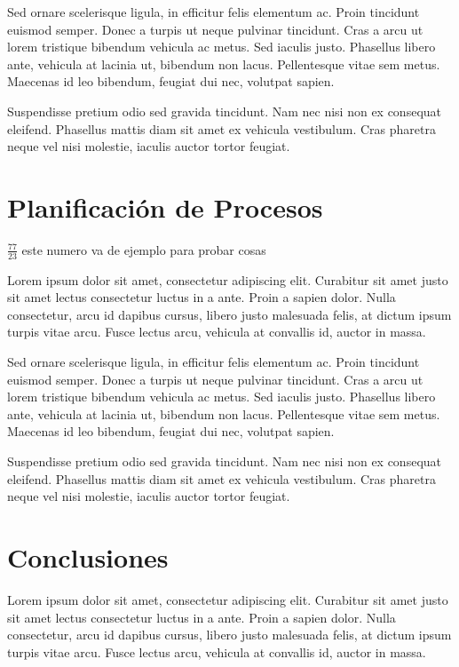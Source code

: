 \documentclass[conference]{IEEEtran}
\begin{document}
Sed ornare scelerisque ligula, in efficitur felis elementum ac. Proin tincidunt euismod semper. Donec a turpis ut neque pulvinar tincidunt. Cras a arcu ut lorem tristique bibendum vehicula ac metus. Sed iaculis justo. Phasellus libero ante, vehicula at lacinia ut, bibendum non lacus. Pellentesque vitae sem metus. Maecenas id leo bibendum, feugiat dui nec, volutpat sapien.
 
Suspendisse pretium odio sed gravida tincidunt. Nam nec nisi non ex consequat eleifend. Phasellus mattis diam sit amet ex vehicula vestibulum. Cras pharetra neque vel nisi molestie, iaculis auctor tortor feugiat.


\section{Planificación de Procesos}
\label{sec:planificacion}
$\frac{77}{23}$ este numero va de ejemplo para probar cosas 

Lorem ipsum dolor sit amet, consectetur adipiscing elit. Curabitur sit amet justo sit amet lectus consectetur luctus in a ante. Proin a sapien dolor. Nulla consectetur, arcu id dapibus cursus, libero justo malesuada felis, at dictum ipsum turpis vitae arcu. Fusce lectus arcu, vehicula at convallis id, auctor in massa.

Sed ornare scelerisque ligula, in efficitur felis elementum ac. Proin tincidunt euismod semper. Donec a turpis ut neque pulvinar tincidunt. Cras a arcu ut lorem tristique bibendum vehicula ac metus. Sed iaculis justo. Phasellus libero ante, vehicula at lacinia ut, bibendum non lacus. Pellentesque vitae sem metus. Maecenas id leo bibendum, feugiat dui nec, volutpat sapien.
 
Suspendisse pretium odio sed gravida tincidunt. Nam nec nisi non ex consequat eleifend. Phasellus mattis diam sit amet ex vehicula vestibulum. Cras pharetra neque vel nisi molestie, iaculis auctor tortor feugiat.


\section{Conclusiones}
\label{sec:conclusiones}

Lorem ipsum dolor sit amet, consectetur adipiscing elit. Curabitur sit amet justo sit amet lectus consectetur luctus in a ante. Proin a sapien dolor. Nulla consectetur, arcu id dapibus cursus, libero justo malesuada felis, at dictum ipsum turpis vitae arcu. Fusce lectus arcu, vehicula at convallis id, auctor in massa.
\end{document}
